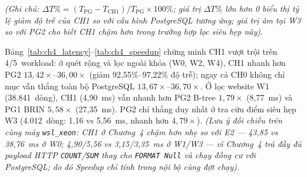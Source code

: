 \documentclass[13pt,a4paper]{report}
\begin{document}
\begin{table}[!htb]
\centering
\footnotesize
\caption[Hệ số tăng tốc và phần trăm giảm độ trễ của CH1 so với PostgreSQL]{Hệ số tăng tốc ($S = T_{\text{PG}} / T_{\text{CH1}}$) và phần trăm giảm độ trễ ($\Delta T\% = (T_{\text{PG}} - T_{\text{CH1}}) / T_{\text{PG}} \times 100\%$) của CH1 so với PostgreSQL}
\label{tab:ch4_speedup}
\end{table}

\noindent\textit{(Ghi chú: $\Delta T\% = (T_{\text{PG}} - T_{\text{CH1}}) / T_{\text{PG}} \times 100\%$; giá trị $\Delta T\%$ lớn hơn 0 biểu thị tỷ lệ giảm độ trễ của CH1 so với cấu hình PostgreSQL tương ứng; giá trị âm tại W3 so với PG2 cho biết CH1 chậm hơn trong trường hợp lọc siêu hẹp này).}

Bảng~\ref{tab:ch4_latency}--\ref{tab:ch4_speedup} chứng minh CH1 vượt trội trên 4/5~workload: ở quét rộng và lọc ngoài khóa (W0, W2, W4), CH1 nhanh hơn PG2 $13{,}42{\times}\text{--}36{,}00{\times}$ (giảm 92,55\%--97,22\% độ trễ); ngay cả CH0 không chỉ mục vẫn thắng toàn bộ PostgreSQL $13{,}67{\times}\text{--}36{,}70{\times}$. Ở lọc website W1 (38.841~dòng), CH1 (4,90~ms) vẫn nhanh hơn PG2 B-tree $1{,}79{\times}$ (8,77~ms) và PG1 BRIN $5{,}58{\times}$ (27,35~ms). PG2 chỉ thắng duy nhất ở tra cứu điểm siêu hẹp W3 (4.012~dòng: 1,16 vs 5,56~ms, nhanh hơn $4{,}79{\times}$). \textit{(Lưu ý đối chiếu trên cùng máy \texttt{wsl\_\allowbreak{}xeon}: CH1 ở Chương~4 chậm hơn nhẹ so với E2 --- 43,85 vs 38,76~ms ở W0; 4,90/5,56 vs 3,15/3,35~ms ở W1/W3 --- vì Chương~4 trả đầy đủ payload HTTP \texttt{COUNT}/\texttt{SUM} thay cho \texttt{FORMAT Null} và chạy đồng cư với PostgreSQL; do đó Speedup chỉ tính trong nội bộ cùng đợt chạy).}
\end{document}
